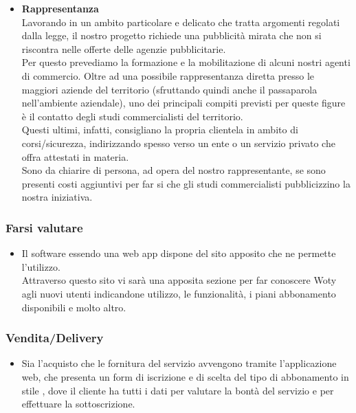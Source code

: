 \begin{itemize}
\item \textbf{Rappresentanza}\\
Lavorando in un ambito particolare e delicato che tratta argomenti regolati dalla legge, il nostro progetto richiede una pubblicità mirata che non si riscontra nelle offerte delle agenzie pubblicitarie.\\ Per questo prevediamo la formazione e la mobilitazione di alcuni nostri agenti di commercio. Oltre ad una possibile rappresentanza diretta presso le maggiori aziende del territorio (sfruttando quindi anche il passaparola nell'ambiente aziendale), uno dei principali compiti previsti per queste figure è il contatto degli studi commercialisti del territorio.\\ Questi ultimi, infatti, consigliano la propria clientela in ambito di corsi/sicurezza, indirizzando spesso verso un ente o un servizio privato che offra attestati in materia.\\ Sono da chiarire di persona, ad opera del nostro rappresentante, se sono presenti costi aggiuntivi per far si che gli studi commercialisti pubblicizzino la nostra iniziativa.

\end{itemize}

\subsubsection{Farsi valutare}
\begin{itemize}
\item Il software essendo una web app dispone del sito apposito che ne permette l'utilizzo.\\
Attraverso questo sito vi sarà una apposita sezione per far conoscere Woty agli nuovi utenti indicandone utilizzo, le funzionalità, i piani abbonamento disponibili e molto altro.
\end{itemize}

\subsubsection{Vendita/Delivery}
\begin{itemize}
\item Sia l'acquisto che le fornitura del servizio avvengono tramite l'applicazione web, che presenta un form di iscrizione e di scelta del tipo di abbonamento in stile , dove il cliente ha tutti i dati per valutare la bontà del servizio e per effettuare la sottoscrizione.
\end{itemize}

